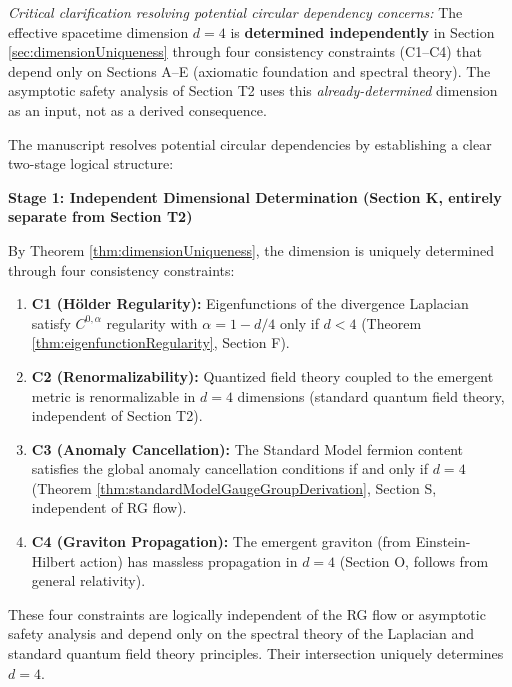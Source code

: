 {\textit{Critical clarification resolving potential circular dependency concerns:} The effective spacetime dimension $d = 4$ is \textbf{determined independently} in Section \ref{sec:dimensionUniqueness} through four consistency constraints (C1--C4) that depend only on Sections A--E (axiomatic foundation and spectral theory). The asymptotic safety analysis of Section T2 uses this \emph{already-determined} dimension as an input, not as a derived consequence.

\begin{remark}
\label{rem:dimensionLogicalOrder}

The manuscript resolves potential circular dependencies by establishing a clear two-stage logical structure:

\textbf{Stage 1: Independent Dimensional Determination (Section K, entirely separate from Section T2)}

By Theorem \ref{thm:dimensionUniqueness}, the dimension is uniquely determined through four consistency constraints:

\begin{enumerate}
\item \textbf{C1 (Hölder Regularity):} Eigenfunctions of the divergence Laplacian satisfy $C^{0,\alpha}$ regularity with $\alpha = 1 - d/4$ only if $d < 4$ (Theorem \ref{thm:eigenfunctionRegularity}, Section F).
\item \textbf{C2 (Renormalizability):} Quantized field theory coupled to the emergent metric is renormalizable in $d = 4$ dimensions (standard quantum field theory, independent of Section T2).
\item \textbf{C3 (Anomaly Cancellation):} The Standard Model fermion content satisfies the global anomaly cancellation conditions if and only if $d = 4$ (Theorem \ref{thm:standardModelGaugeGroupDerivation}, Section S, independent of RG flow).
\item \textbf{C4 (Graviton Propagation):} The emergent graviton (from Einstein-Hilbert action) has massless propagation in $d = 4$ (Section O, follows from general relativity).
\end{enumerate}

These four constraints are logically independent of the RG flow or asymptotic safety analysis and depend only on the spectral theory of the Laplacian and standard quantum field theory principles. Their intersection uniquely determines $d = 4$.


\end{remark}}
